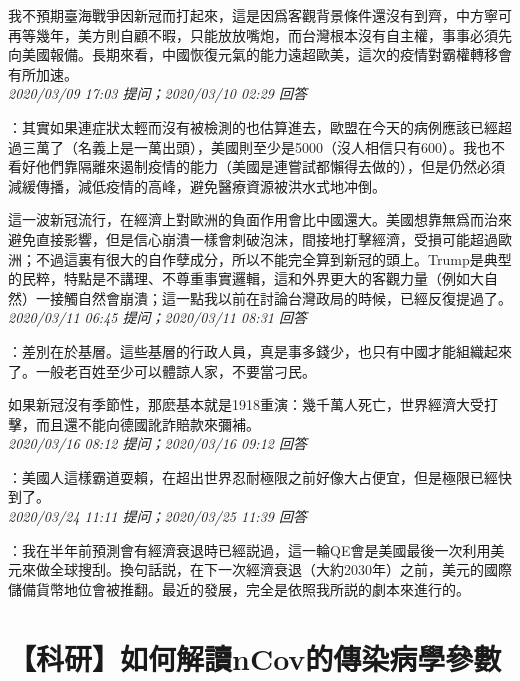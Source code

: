 \documentclass[twocolumn]{ctexart}
\begin{document}
我不預期臺海戰爭因新冠而打起來，這是因爲客觀背景條件還沒有到齊，中方寧可再等幾年，美方則自顧不暇，只能放放嘴炮，而台灣根本沒有自主權，事事必須先向美國報備。長期來看，中國恢復元氣的能力遠超歐美，這次的疫情對霸權轉移會有所加速。
\\

\textit{\hfill\noindent\small 2020/03/09 17:03 提问；2020/03/10 02:29 回答}

：其實如果連症狀太輕而沒有被檢測的也估算進去，歐盟在今天的病例應該已經超過三萬了（名義上是一萬出頭），美國則至少是5000（沒人相信只有600）。我也不看好他們靠隔離來遏制疫情的能力（美國是連嘗試都懶得去做的），但是仍然必須減緩傳播，減低疫情的高峰，避免醫療資源被洪水式地冲倒。

這一波新冠流行，在經濟上對歐洲的負面作用會比中國還大。美國想靠無爲而治來避免直接影響，但是信心崩潰一樣會刺破泡沫，間接地打擊經濟，受損可能超過歐洲；不過這裏有很大的自作孽成分，所以不能完全算到新冠的頭上。Trump是典型的民粹，特點是不講理、不尊重事實邏輯，這和外界更大的客觀力量（例如大自然）一接觸自然會崩潰；這一點我以前在討論台灣政局的時候，已經反復提過了。
\\

\textit{\hfill\noindent\small 2020/03/11 06:45 提问；2020/03/11 08:31 回答}

：差別在於基層。這些基層的行政人員，真是事多錢少，也只有中國才能組織起來了。一般老百姓至少可以體諒人家，不要當刁民。

如果新冠沒有季節性，那麽基本就是1918重演：幾千萬人死亡，世界經濟大受打擊，而且還不能向德國訛詐賠款來彌補。
\\

\textit{\hfill\noindent\small 2020/03/16 08:12 提问；2020/03/16 09:12 回答}

：美國人這樣霸道耍賴，在超出世界忍耐極限之前好像大占便宜，但是極限已經快到了。
\\

\textit{\hfill\noindent\small 2020/03/24 11:11 提问；2020/03/25 11:39 回答}

：我在半年前預測會有經濟衰退時已經説過，這一輪QE會是美國最後一次利用美元來做全球搜刮。換句話説，在下一次經濟衰退（大約2030年）之前，美元的國際儲備貨幣地位會被推翻。最近的發展，完全是依照我所説的劇本來進行的。
\\


\section{【科研】如何解讀nCov的傳染病學參數}
\end{document}
